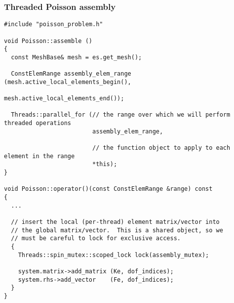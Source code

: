 \begin{frame}
  \frametitle{Threaded Poisson assembly}

  \begin{lstlisting}
#include "poisson_problem.h"

void Poisson::assemble ()
{
  const MeshBase& mesh = es.get_mesh();

  ConstElemRange assembly_elem_range (mesh.active_local_elements_begin(),
                                      mesh.active_local_elements_end());

  Threads::parallel_for (// the range over which we will perform threaded operations
                         assembly_elem_range,

                         // the function object to apply to each element in the range
                         *this);
}

void Poisson::operator()(const ConstElemRange &range) const
{
  ...

  // insert the local (per-thread) element matrix/vector into
  // the global matrix/vector.  This is a shared object, so we
  // must be careful to lock for exclusive access.
  {
    Threads::spin_mutex::scoped_lock lock(assembly_mutex);
    
    system.matrix->add_matrix (Ke, dof_indices);
    system.rhs->add_vector    (Fe, dof_indices);
  }
}
  \end{lstlisting}
\end{frame}

